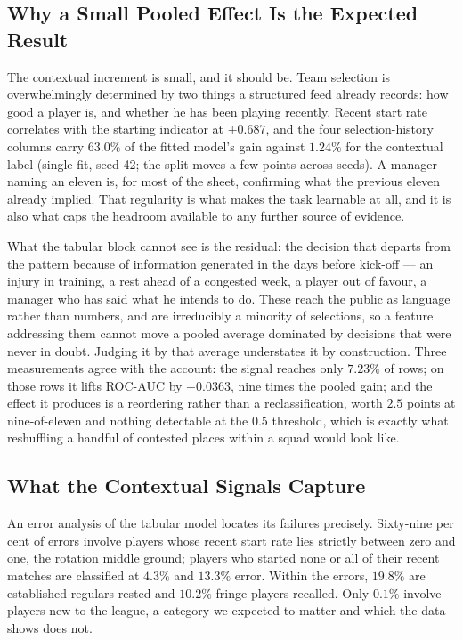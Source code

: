 \documentclass[conference]{IEEEtran}
\begin{document}
\subsection{Why a Small Pooled Effect Is the Expected Result}

The contextual increment is small, and it should be. Team selection is overwhelmingly determined by two things a structured feed already records: how good a player is, and whether he has been playing recently. Recent start rate correlates with the starting indicator at $+0.687$, and the four selection-history columns carry $63.0\%$ of the fitted model's gain against $1.24\%$ for the contextual label (single fit, seed 42; the split moves a few points across seeds). A manager naming an eleven is, for most of the sheet, confirming what the previous eleven already implied. That regularity is what makes the task learnable at all, and it is also what caps the headroom available to any further source of evidence.

What the tabular block cannot see is the residual: the decision that departs from the pattern because of information generated in the days before kick-off --- an injury in training, a rest ahead of a congested week, a player out of favour, a manager who has said what he intends to do. These reach the public as language rather than numbers, and are irreducibly a minority of selections, so a feature addressing them cannot move a pooled average dominated by decisions that were never in doubt. Judging it by that average understates it by construction. Three measurements agree with the account: the signal reaches only $7.23\%$ of rows; on those rows it lifts ROC-AUC by $+0.0363$, nine times the pooled gain; and the effect it produces is a reordering rather than a reclassification, worth $2.5$ points at nine-of-eleven and nothing detectable at the $0.5$ threshold, which is exactly what reshuffling a handful of contested places within a squad would look like.

\subsection{What the Contextual Signals Capture}

An error analysis of the tabular model locates its failures precisely. Sixty-nine per cent of errors involve players whose recent start rate lies strictly between zero and one, the rotation middle ground; players who started none or all of their recent matches are classified at $4.3\%$ and $13.3\%$ error. Within the errors, $19.8\%$ are established regulars rested and $10.2\%$ fringe players recalled. Only $0.1\%$ involve players new to the league, a category we expected to matter and which the data shows does not.
\end{document}
